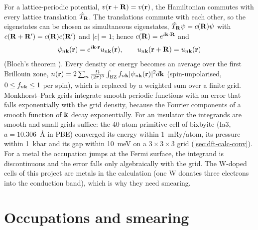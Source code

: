 For a lattice-periodic potential, $v(\mathbf{r}+\mathbf{R}) = v(\mathbf{r})$, the Hamiltonian commutes with every lattice translation
$\hat T_{\mathbf{R}}$. The translations commute with each other, so the eigenstates can be chosen as simultaneous eigenstates,
$\hat T_{\mathbf{R}}\psi = c(\mathbf{R})\psi$ with $c(\mathbf{R}+\mathbf{R}') = c(\mathbf{R})c(\mathbf{R}')$ and $|c|=1$; hence $c(\mathbf{R}) = e^{i\mathbf{k}\cdot\mathbf{R}}$ and
\begin{equation}
\psi_{n\mathbf{k}}(\mathbf{r}) = e^{i\mathbf{k}\cdot\mathbf{r}}u_{n\mathbf{k}}(\mathbf{r}), \qquad u_{n\mathbf{k}}(\mathbf{r}+\mathbf{R}) = u_{n\mathbf{k}}(\mathbf{r})
\label{eq:mono-dft-bloch}
\end{equation}
(Bloch's theorem \citep{Bloch1929}). Every density or energy becomes an average over the first Brillouin zone,
$n(\mathbf{r}) = 2\sum_n \frac{\Omega}{(2\pi)^3}\int_{\mathrm{BZ}} f_{n\mathbf{k}}|\psi_{n\mathbf{k}}(\mathbf{r})|^2 d\mathbf{k}$ (spin-unpolarised,
$0 \le f_{n\mathbf{k}} \le 1$ per spin), which is replaced by a
weighted sum over a finite grid. Monkhorst--Pack grids \citep{Monkhorst1976} integrate smooth periodic functions with
an error that falls exponentially with the grid density, because the Fourier components of a smooth function of $\mathbf{k}$
decay exponentially. For an insulator the integrands are smooth and small grids suffice: the 40-atom primitive cell of
bixbyite (Ia$\bar3$, $a = 10.306$~\AA{} in PBE) converged its energy within 1~mRy/atom, its pressure within 1~kbar and
its gap within 10~meV on a $3\times3\times3$ grid (\cref{sec:dft-calc-conv}). For a metal the occupation jumps at the
Fermi surface, the integrand is discontinuous and the error falls only algebraically with the grid. The W-doped cells
of this project are metals in the calculation (one W donates three electrons into the conduction band), which is why
they need smearing.

\section{Occupations and smearing}
\label{sec:mono-dft-smearing}

